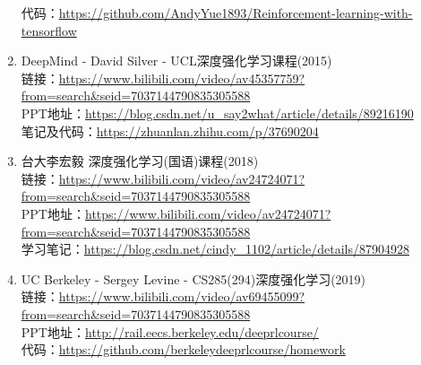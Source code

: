 \documentclass[lang=cn,11pt,a4paper]{elegant_template}
\begin{document}
\begin{enumerate}
    代码：\href{https://github.com/AndyYue1893/Reinforcement-learning-with-tensorflow}{https://github.com/AndyYue1893/Reinforcement-learning-with-tensorflow}  
    \item DeepMind - David Silver - UCL深度强化学习课程(2015) \\
    链接：\href{https://www.bilibili.com/video/av45357759?from=search&seid=7037144790835305588}{https://www.bilibili.com/video/av45357759?from=search\&seid=7037144790835305588}  \\
    PPT地址：\href{https://blog.csdn.net/u_say2what/article/details/89216190}{https://blog.csdn.net/u\_say2what/article/details/89216190} \\
    笔记及代码：\href{https://zhuanlan.zhihu.com/p/37690204}{https://zhuanlan.zhihu.com/p/37690204} 
    \item 台大李宏毅 深度强化学习(国语)课程(2018) \\
    链接：\href{https://www.bilibili.com/video/av24724071?from=search&seid=7037144790835305588}{https://www.bilibili.com/video/av24724071?from=search\&seid=7037144790835305588}  \\
    PPT地址：\href{https://www.bilibili.com/video/av24724071?from=search&seid=7037144790835305588}{https://www.bilibili.com/video/av24724071?from=search\&seid=7037144790835305588}  \\
    学习笔记：\href{https://blog.csdn.net/cindy_1102/article/details/87904928}{https://blog.csdn.net/cindy\_1102/article/details/87904928} 
    \item UC Berkeley - Sergey Levine - CS285(294)深度强化学习(2019) \\
    链接：\href{https://www.bilibili.com/video/av69455099?from=search&seid=7037144790835305588}{https://www.bilibili.com/video/av69455099?from=search\&seid=7037144790835305588}  \\
    PPT地址：\href{http://rail.eecs.berkeley.edu/deeprlcourse/}{http://rail.eecs.berkeley.edu/deeprlcourse/}  \\
    代码：\href{https://github.com/berkeleydeeprlcourse/homework}{https://github.com/berkeleydeeprlcourse/homework}
\end{enumerate}
\end{document}
